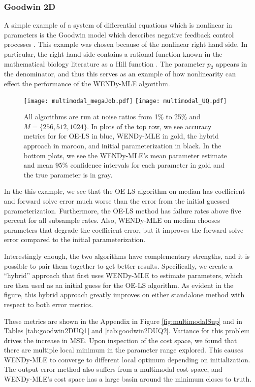 \subsubsection{Goodwin 2D}\label{sec:goodwin2d}
A simple example of a system of differential equations which is nonlinear in parameters is the Goodwin model which describes negative feedback control processes \citep{Calderhead2012PhD,Goodwin1965AdvancesinEnzymeRegulation}. This example was chosen because of the nonlinear right hand side. In particular, the right hand side contains a rational function known in the mathematical biology literature as a Hill function \cite{HIll1910JPhysiol,GoutelleMaurinRougierEtAl2008FundamemntalClinicalPharma}. The parameter $p_2$ appears in the denominator, and thus this serves as an example of how nonlinearity can effect the performance of the WENDy-MLE algorithm. 

\begin{figure}[H]
	\centering
	\texttt{[image: multimodal\_megaJob.pdf]}
	\texttt{[image: multimodal\_UQ.pdf]}
	\caption{All algorithms are run at noise ratios from 1\% to 25\% and $M = \{256, 512, 1024\}$. In plots of the top row, we see accuracy metrics for for OE-LS in blue, WENDy-MLE in gold, the hybrid approach in maroon, and initial parameterization in black. In the bottom plots, we see the WENDy-MLE's mean parameter estimate and mean 95\% confidence intervals for each parameter in gold and the true parameter is in gray.}
	\label{fig:goodwin2dMega}
\end{figure}

In the this example, we see that the OE-LS algorithm on median has coefficient and forward solve error much worse than the error from the initial guessed parameterization. Furthermore, the OE-LS method has failure rates above five percent for all subsample rates. Also, WENDy-MLE on median chooses parameters that degrade the coefficient error, but it improves the forward solve error compared to the initial parameterization. 

Interestingly enough, the two algorithms have complementary strengths, and it is possible to pair them together to get better results. Specifically, we create a ``hybrid'' approach that first uses WENDy-MLE to estimate parameters, which are then used as an initial guess for the OE-LS algorithm. As evident in the figure, this hybrid approach greatly improves on either standalone method with respect to both error metrics.

 These metrics are shown in the Appendix in Figure \ref{fig:multimodalSup} and in Tables \ref{tab:goodwin2DUQ1} and \ref{tab:goodwin2DUQ2}. Variance for this problem drives the increase in MSE. Upon inspection of the cost space, we found that there are multiple local minimum in the parameter range explored. This causes WENDy-MLE to converge to different local optimum depending on initialization. The output error method also suffers from a multimodal cost space, and WENDy-MLE's cost space has a large basin around the minimum closes to truth. 

